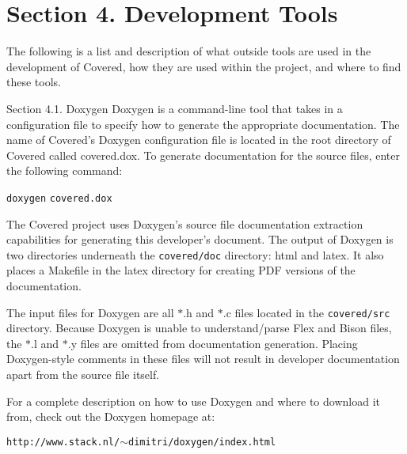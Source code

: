 \section{Section 4.  Development Tools}\label{page_tools}
\begin{Desc}
\item[]The following is a list and description of what outside tools are used in the development of Covered, how they are used within the project, and where to find these tools.\end{Desc}
\begin{Desc}
\item[Section 4.1. Doxygen]Doxygen is a command-line tool that takes in a configuration file to specify how to generate the appropriate documentation. The name of Covered's Doxygen configuration file is located in the root directory of Covered called covered.dox. To generate documentation for the source files, enter the following command:\end{Desc}
\begin{Desc}
\item[]{\tt doxygen}  {\tt covered.dox}  \end{Desc}
\begin{Desc}
\item[]The Covered project uses Doxygen's source file documentation extraction capabilities for generating this developer's document. The output of Doxygen is two directories underneath the {\tt covered/doc}  directory: html and latex. It also places a Makefile in the latex directory for creating PDF versions of the documentation.\end{Desc}
\begin{Desc}
\item[]The input files for Doxygen are all $\ast$.h and $\ast$.c files located in the {\tt covered/src}  directory. Because Doxygen is unable to understand/parse Flex and Bison files, the $\ast$.l and $\ast$.y files are omitted from documentation generation. Placing Doxygen-style comments in these files will not result in developer documentation apart from the source file itself.\end{Desc}
\begin{Desc}
\item[]For a complete description on how to use Doxygen and where to download it from, check out the Doxygen homepage at:\end{Desc}
\begin{Desc}
\item[]{\tt http://www.stack.nl/$\sim$dimitri/doxygen/index.html}\end{Desc}




